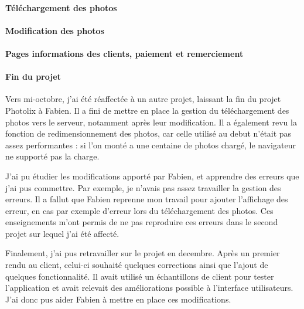 \paragraph{Téléchargement des
photos}\label{tuxe9luxe9chargement-des-photos}

\bigskip

\paragraph{Modification des photos}\label{modification-des-photos}

\bigskip

\paragraph{Pages informations des clients, paiement et
remerciement}\label{pages-informations-des-clients-paiement-et-remerciement}

\bigskip

\paragraph{Fin du projet}\label{fin-du-projet}

\bigskip

Vers mi-octobre, j'ai été réaffectée à un autre projet, laissant la fin
du projet Photolix à Fabien. Il a fini de mettre en place la gestion du
téléchargement des photos vers le serveur, notamment après leur
modification. Il a également revu la fonction de redimensionnement des
photos, car celle utilisé au debut n'était pas assez performantes : si
l'on monté a une centaine de photos chargé, le navigateur ne supporté
pas la charge.

\bigskip

J'ai pu étudier les modifications apporté par Fabien, et apprendre des
erreurs que j'ai pus commettre. Par exemple, je n'avais pas assez
travailler la gestion des erreurs. Il a fallut que Fabien reprenne mon
travail pour ajouter l'affichage des erreur, en cas par exemple d'erreur
lors du téléchargement des photos. Ces enseignements m'ont permis de ne
pas reproduire ces erreurs dans le second projet sur lequel j'ai été
affecté.

\bigskip

Finalement, j'ai pus retravailler sur le projet en decembre. Après un
premier rendu au client, celui-ci souhaité quelques corrections ainsi
que l'ajout de quelques fonctionnalité. Il avait utilisé un échantillons
de client pour tester l'application et avait relevait des améliorations
possible à l'interface utilisateurs. J'ai donc pus aider Fabien à mettre
en place ces modifications.

